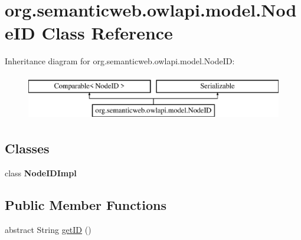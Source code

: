 \hypertarget{classorg_1_1semanticweb_1_1owlapi_1_1model_1_1_node_i_d}{\section{org.\-semanticweb.\-owlapi.\-model.\-Node\-I\-D Class Reference}
\label{classorg_1_1semanticweb_1_1owlapi_1_1model_1_1_node_i_d}
}
Inheritance diagram for org.\-semanticweb.\-owlapi.\-model.\-Node\-I\-D\-:\begin{figure}[H]
\begin{center}
\leavevmode
\includegraphics[height=2.000000cm]{classorg_1_1semanticweb_1_1owlapi_1_1model_1_1_node_i_d}
\end{center}
\end{figure}
\subsection*{Classes}
\begin{DoxyCompactItemize}
\item 
class {\bfseries Node\-I\-D\-Impl}
\end{DoxyCompactItemize}
\subsection*{Public Member Functions}
\begin{DoxyCompactItemize}
\item 
abstract String \hyperlink{classorg_1_1semanticweb_1_1owlapi_1_1model_1_1_node_i_d_ac47a52dddfab70fb35c12394b9e8f02d}{get\-I\-D} ()
\end{DoxyCompactItemize}
